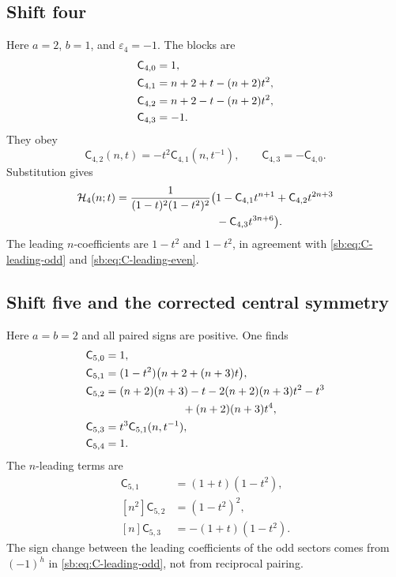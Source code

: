 \documentclass[11pt]{article}
\theoremstyle{definition}
\theoremstyle{remark}
\newcommand{\Ht}{\mathcal H}
\newcommand{\Cblock}{\mathsf C}
\newcommand{\epsK}{\varepsilon}
\theoremstyle{definition}
\theoremstyle{plain}
\numberwithin{equation}{section}
\begin{document}
\subsection{Shift four}
Here $a=2$, $b=1$, and $\epsK_4=-1$.  The blocks are
\begin{align}
 \Cblock_{4,0}&=1,\notag\\
 \Cblock_{4,1}&=n+2+t-(n+2)t^2,\notag\\
 \Cblock_{4,2}&=n+2-t-(n+2)t^2,\notag\\
 \Cblock_{4,3}&=-1.
 \label{sb:eq:K4-blocks}
\end{align}
They obey
\[
 \Cblock_{4,2}(n,t)=-t^2\Cblock_{4,1}(n,t^{-1}),
 \qquad \Cblock_{4,3}=-\Cblock_{4,0}.
\]
Substitution gives
\begin{align}
 \Ht_4(n;t)=\frac{1}{(1-t)^2(1-t^2)^2}\bigl(&1
 -\Cblock_{4,1}t^{n+1}
 +\Cblock_{4,2}t^{2n+3}\notag\\
 &-\Cblock_{4,3}t^{3n+6}\bigr).
 \label{sb:eq:K4-expansion}
\end{align}
The leading $n$-coefficients are $1-t^2$ and $1-t^2$, in agreement with
\eqref{sb:eq:C-leading-odd} and \eqref{sb:eq:C-leading-even}.

\subsection{Shift five and the corrected central symmetry}
Here $a=b=2$ and all paired signs are positive.  One finds
\begin{align}
 \Cblock_{5,0}&=1,\notag\\
 \Cblock_{5,1}&=(1-t^2)\bigl(n+2+(n+3)t\bigr),\notag\\
 \Cblock_{5,2}&=(n+2)(n+3)-t
 -2(n+2)(n+3)t^2-t^3\notag\\
 &\hspace{7em}+(n+2)(n+3)t^4,\notag\\
 \Cblock_{5,3}&=t^3\Cblock_{5,1}(n,t^{-1}),\notag\\
 \Cblock_{5,4}&=1.
 \label{sb:eq:K5-blocks}
\end{align}
The $n$-leading terms are
\begin{align*}
 [n]\Cblock_{5,1}&=(1+t)(1-t^2),\\
 [n^2]\Cblock_{5,2}&=(1-t^2)^2,\\
 [n]\Cblock_{5,3}&=-(1+t)(1-t^2).
\end{align*}
The sign change between the leading coefficients of the odd sectors comes
from $(-1)^h$ in \eqref{sb:eq:C-leading-odd}, not from reciprocal pairing.
\end{document}
